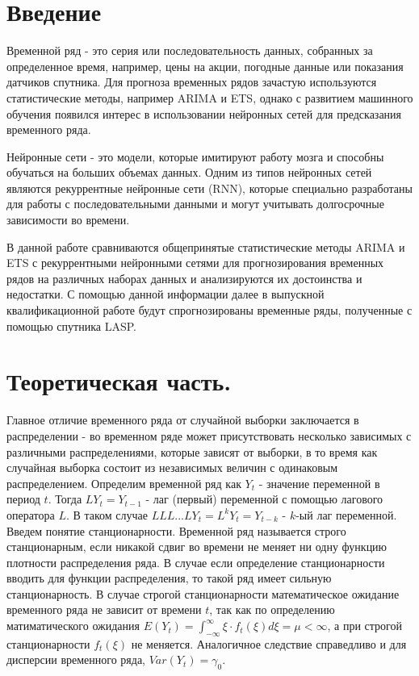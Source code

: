 \documentclass[12pt, a4paper]{article} %
\begin{document}




% 
\newpage
\setcounter{page}{2}
\tableofcontents
\newpage

\section{Введение}
Временной ряд - это серия или последовательность данных, собранных за определенное время, например, цены на акции, погодные данные или показания датчиков спутника. Для прогноза временных рядов зачастую используются статистические методы, например ARIMA и ETS, однако с развитием машинного обучения появился интерес в использовании нейронных сетей для предсказания временного ряда.

Нейронные сети - это модели, которые имитируют работу мозга и способны обучаться на больших объемах данных. Одним из типов нейронных сетей являются рекуррентные нейронные сети (RNN), которые специально разработаны для работы с последовательными данными и могут учитывать долгосрочные зависимости во времени.

В данной работе сравниваются общепринятые статистические методы ARIMA и ETS с рекуррентными нейронными сетями для прогнозирования временных рядов на различных наборах данных и анализируются их достоинства и недостатки. С помощью данной информации далее в выпускной квалификационной работе будут спрогнозированы временные ряды, полученные с помощью спутника LASP.

\newpage
\section{Теоретическая часть.}
Главное отличие временного ряда от случайной выборки заключается в распределении - во временном ряде может присутствовать несколько зависимых с различными распределениями, которые зависят от выборки, в то время как случайная выборка состоит из независимых величин с одинаковым распределением. Определим временной ряд как $Y_t$ - значение переменной в период $t$. Тогда $LY_t = Y_{t-1}$ - лаг (первый) переменной с помощью лагового оператора $L$. В таком случае $LLL...LY_t = L^kY_t = Y_{t-k}$ - $k$-ый лаг переменной. 
Введем понятие станционарности.
Временной ряд называется строго станционарным, если никакой сдвиг во времени не меняет ни одну функцию плотности распределения ряда. В случае если определение станционарности вводить для функции распределения, то такой ряд имеет сильную станционарность.
В случае строгой станционарности математическое ожидание временного ряда не зависит от времени $t$, так как по определению матиматического ожидания $E(Y_t)=\int_{-\infty}^{\infty}\xi\cdot f_t(\xi)d\xi = \mu < \infty$, а при строгой станционарности $f_t(\xi)$ не меняется. Аналогичное следствие справедливо и для дисперсии временного ряда, $Var(Y_t)=\gamma_0$.
\end{document}
